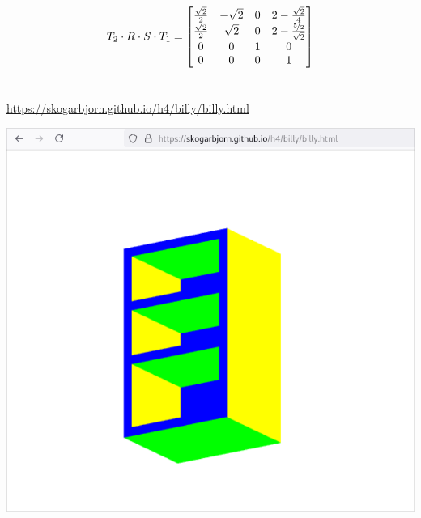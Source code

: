 \documentclass{article}
\begin{document}
		\[T_2 \cdot R \cdot S \cdot T_1 = \begin{bmatrix}
			\frac{\sqrt{2}}{2} & -\sqrt{2} & 0 & 2 - \frac{\sqrt{2}}{4} \\
			\frac{\sqrt{2}}{2} & \sqrt{2} & 0 & 2 - \frac{\nicefrac{5}{2}}{\sqrt{2}} \\
		0 & 0 & 1 & 0 \\
		0 & 0 & 0 & 1
		\end{bmatrix}\]

		\newpage
		\section{}

		\url{https://skogarbjorn.github.io/h4/billy/billy.html}
		\begin{center}
			\includegraphics[scale=0.35]{billy.png}
		\end{center}

		\newpage
		\section{}
\end{document}
